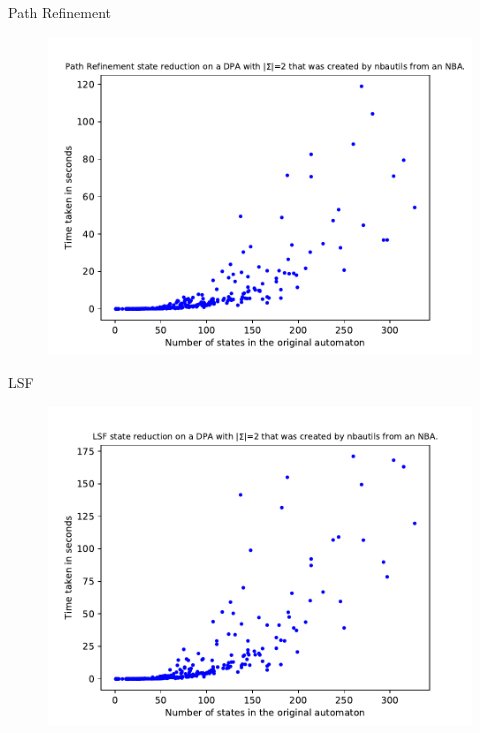 \begin{frame}{Path Refinement}
\begin{figure}
	\centering
	\includegraphics[page=6,height=.8\textheight]{../data/analysis/path_refinement/detnbaut_ap1.pdf} 
\end{figure}
\end{frame}

\begin{frame}{LSF}
\begin{figure}
	\centering
	\includegraphics[page=6,height=.8\textheight]{../data/analysis/lsf/detnbaut_ap1.pdf} 
\end{figure}
\end{frame}

